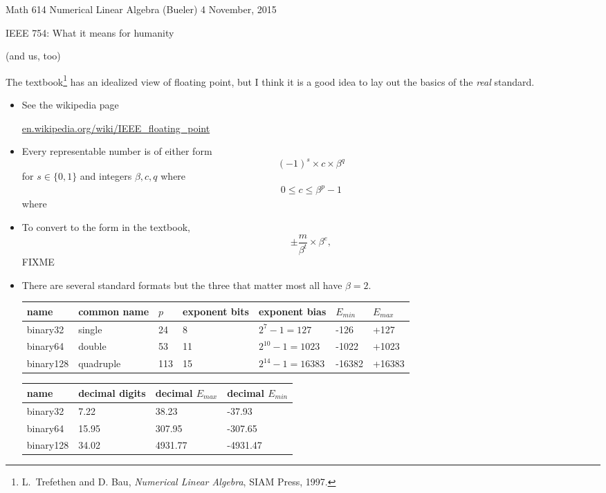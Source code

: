 \documentclass[11pt]{amsart}
\begin{document}
\scriptsize \noindent Math 614 Numerical Linear Algebra (Bueler) \hfill 4 November, 2015
\normalsize

\medskip\bigskip
\Large\centerline{IEEE 754: What it means for humanity}

\large
\centerline{(and us, too)}

\bigskip
\normalsize

\thispagestyle{empty}

\bigskip

The textbook\footnote{L.~Trefethen and D. Bau, \emph{Numerical Linear Algebra}, SIAM Press, 1997.} has an idealized view of floating point, but I think it is a good idea to lay out the basics of the \emph{real} standard.


\begin{itemize}
\setlength\itemsep{1em}
\item See the wikipedia page

 \centerline{\url{en.wikipedia.org/wiki/IEEE_floating_point}}

\item Every representable number is of either form
    $$(-1)^s \times c \times \beta^q$$
for $s\in\{0,1\}$ and integers $\beta,c,q$ where
\begin{gather*}
0 \le c \le \beta^p-1
\end{gather*}
where

\item To convert to the form in the textbook,
    $$\pm \frac{m}{\beta^t} \times \beta^e,$$
FIXME

\item There are several standard formats but the three that matter most all have $\beta=2$.  

\medskip
\small
\begin{tabular}{lllllll}
name & common name & $p$ & exponent bits & exponent bias & $E_{min}$ & $E_{max}$ \\ \hline
%
binary32 &
single &
24 &
8 &
$2^7-1=127$ &
-126 &
+127 \\
%
binary64 &
double &
53 &
11 &
$2^{10}-1=1023$ &
-1022 &
+1023 \\
%
binary128 &
quadruple &
113 &
15 &
$2^{14}-1=16383$ &
-16382 &
+16383
\end{tabular}

\begin{tabular}{llll}
name & decimal digits & decimal $E_{max}$ & decimal $E_{min}$ \\ \hline
%
binary32 &
7.22 &
38.23 &
-37.93 \\
%
binary64 &
15.95 &
307.95 &
-307.65 \\
%
binary128 &
34.02 &
4931.77 &
-4931.47
\end{tabular}

\end{itemize}
\end{document}
